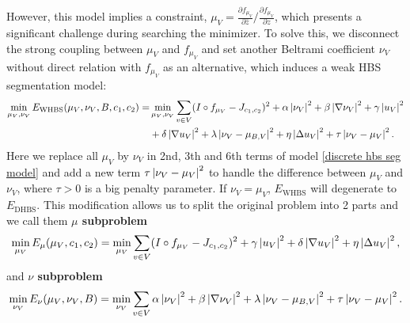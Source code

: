 \documentclass[review,onefignum,onetabnum]{siamonline190516}
\begin{document}
However, this model implies a constraint, $\mu_V = \frac{\partial f_{\mu_V}}{\partial \bar{z}} / \frac{\partial f_{\mu_V}}{\partial z}$, which presents a significant challenge during searching the minimizer. To solve this, we disconnect the strong coupling between $\mu_V$ and $f_{\mu_V}$ and set another Beltrami coefficient $\nu_{V}$ without direct relation with $f_{\mu_V}$ as an alternative, which induces a weak HBS segmentation model:
\begin{equation}\label{weak discrete hbs seg model}
    \begin{split}
        \min_{\mu_V, \nu_V} E_{\text{WHBS}}(\mu_V, \nu_V, B, c_1, c_2) = 
        & \min_{\mu_V, \nu_V} \sum_{v \in V}
        (I \circ f_{\mu_V} - J_{c_1,c_2})^2 
        + \alpha \abs{\nu_V}^2 + \beta \abs{\nabla \nu_V}^2 
        + \gamma \abs{u_V}^2 \\
        & + \delta \abs{\nabla u_V}^2
        + \lambda \abs{\nu_V - \mu_{B,V}}^2 + \eta \abs{\Delta u_V}^2 + \tau \abs{\nu_V - \mu_V}^2.
    \end{split}
\end{equation}
Here we replace all $\mu_V$ by $\nu_V$ in 2nd, 3th and 6th terms of model \ref{discrete hbs seg model} and add a new term $\tau \left\vert \nu_V - \mu_V \right\vert^2$ to handle the difference between $\mu_V$ and $\nu_V$, where $\tau > 0$ is a big penalty parameter. If $\nu_V = \mu_V$, $E_{\text{WHBS}}$ will degenerate to $E_{\text{DHBS}}$. This modification allows us to split the original problem into 2 parts and we call them \textbf{$\mu$ subproblem}
\begin{equation}\label{mu subproblem}
    \min_{\mu_V} E_{\mu}(\mu_V, c_1, c_2) = 
    \min_{\mu_V} \sum_{v \in V}
    (I \circ f_{\mu_V} - J_{c_1,c_2})^2 
    + \gamma \abs{u_V}^2 
    + \delta \abs{\nabla u_V}^2
    + \eta \abs{\Delta u_V}^2,
\end{equation}
and \textbf{$\nu$ subproblem}
\begin{equation}\label{nu subproblem}
    \min_{\nu_V} E_{\nu}(\mu_V, \nu_V, B) = 
    \min_{\nu_V} \sum_{v \in V}
    \alpha \abs{\nu_V}^2 + \beta \abs{\nabla \nu_V}^2 
    + \lambda \abs{\nu_V - \mu_{B,V}}^2 + \tau \abs{\nu_V - \mu_V}^2.
\end{equation}
\end{document}
